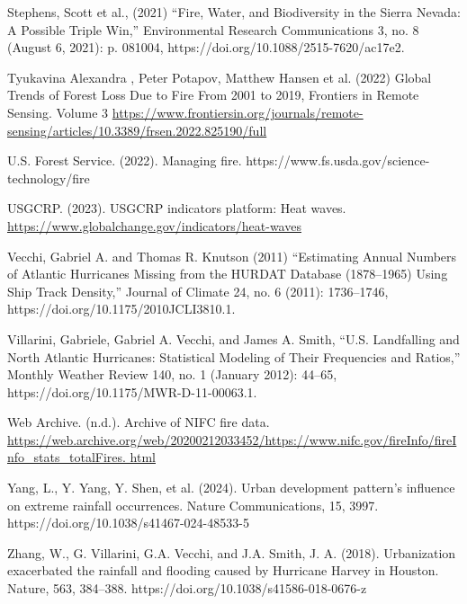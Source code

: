 \documentclass[12pt,paper=a4,DIV=12,parskip=never,chapterprefix=false,headings=standardclasses]{scrreprt}
\begin{document}
Stephens, Scott et al., (2021) “Fire, Water, and Biodiversity in the Sierra Nevada: A Possible Triple Win,”
Environmental Research Communications 3, no. 8 (August 6, 2021): p. 081004,
https://doi.org/10.1088/2515-7620/ac17e2.

Tyukavina Alexandra , Peter Potapov, Matthew Hansen et al. (2022) Global Trends of Forest Loss Due to
Fire From 2001 to 2019, Frontiers in Remote Sensing. Volume 3
\url{https://www.frontiersin.org/journals/remote-sensing/articles/10.3389/frsen.2022.825190/full}

U.S. Forest Service. (2022). Managing fire. https://www.fs.usda.gov/science-technology/fire

USGCRP. (2023). USGCRP indicators platform: Heat waves.
\url{https://www.globalchange.gov/indicators/heat-waves}

Vecchi, Gabriel A. and Thomas R. Knutson (2011) “Estimating Annual Numbers of Atlantic Hurricanes
Missing from the HURDAT Database (1878–1965) Using Ship Track Density,” Journal of Climate
24, no. 6 (2011): 1736–1746, https://doi.org/10.1175/2010JCLI3810.1.

Villarini, Gabriele, Gabriel A. Vecchi, and James A. Smith, “U.S. Landfalling and North Atlantic
Hurricanes: Statistical Modeling of Their Frequencies and Ratios,” Monthly Weather Review 140, no.
1 (January 2012): 44–65, https://doi.org/10.1175/MWR-D-11-00063.1.

Web Archive. (n.d.). Archive of NIFC fire data.
\url{https://web.archive.org/web/20200212033452/https://www.nifc.gov/fireInfo/fireInfo_stats_totalFires.
html}

Yang, L., Y. Yang, Y. Shen, et al. (2024). Urban development pattern’s influence on extreme rainfall
occurrences. Nature Communications, 15, 3997. https://doi.org/10.1038/s41467-024-48533-5

Zhang, W., G. Villarini, G.A. Vecchi, and J.A. Smith, J. A. (2018). Urbanization exacerbated the rainfall
and flooding caused by Hurricane Harvey in Houston. Nature, 563, 384–388.
https://doi.org/10.1038/s41586-018-0676-z
\endgroup
\end{document}
